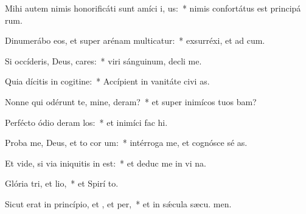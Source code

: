 \item Mihi autem nimis honorificáti sunt amíci i, us:~* nimis confortátus est principá rum.
\item Dinumerábo eos, et super arénam multicatur:~* exsurréxi, et ad  cum.
\item Si occíderis, Deus, cares:~* viri sánguinum, decli  me.
\item Quia dícitis in cogitine:~* Accípient in vanitáte civi as.
\item Nonne qui odérunt te, mine, deram?~* et super inimícos tuos bam?
\item Perfécto ódio deram los:~* et inimíci fac  hi.
\item Proba me, Deus, et to cor um:~* intérroga me, et cognósce sé as.
\item Et vide, si via iniquitis in  est:~* et deduc me in vi na.
\item Glória tri, et lio,~* et Spirí to.
\item Sicut erat in princípio, et , et per,~* et in sǽcula sæcu. men.
